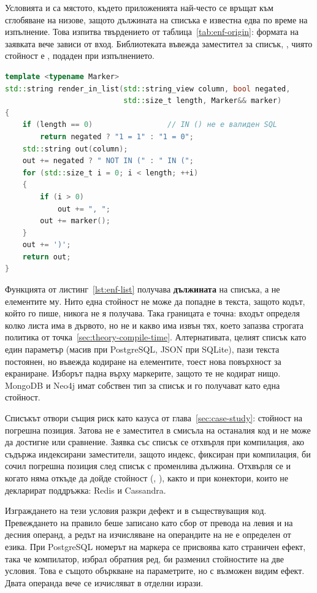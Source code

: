 Условията  и  са мястото, където приложенията най-често се
връщат към сглобяване на низове, защото дължината на списъка е известна едва по
време на изпълнение. Това изпитва твърдението от таблица~\ref{tab:enf-origin}:
формата на заявката вече зависи от вход. Библиотеката въвежда заместител за
списък, , чиято стойност е ,
подаден при изпълнението.

\begin{lstlisting}[language=C++,caption={Единственото, което списъкът променя в текста (съкратено)},label={lst:enf-list}]
template <typename Marker>
std::string render_in_list(std::string_view column, bool negated,
                           std::size_t length, Marker&& marker)
{
    if (length == 0)                 // IN () не е валиден SQL
        return negated ? "1 = 1" : "1 = 0";
    std::string out(column);
    out += negated ? " NOT IN (" : " IN (";
    for (std::size_t i = 0; i < length; ++i)
    {
        if (i > 0)
            out += ", ";
        out += marker();
    }
    out += ')';
    return out;
}
\end{lstlisting}

Функцията от листинг~\ref{lst:enf-list} получава \textbf{дължината} на списъка, а
не елементите му. Нито една стойност не може да попадне в текста, защото кодът,
който го пише, никога не я получава. Така границата е точна: входът определя
колко листа има в дървото, но не и какво има извън тях, което запазва строгата
политика от точка~\ref{sec:theory-compile-time}. Алтернативата, целият списък
като един параметър (масив при PostgreSQL, JSON при SQLite), пази текста постоянен,
но въвежда кодиране на елементите, тоест нова повърхност за екраниране. Изборът
падна върху маркерите, защото те не кодират нищо. MongoDB и Neo4j имат собствен
тип за списък и го получават като една стойност.

Списъкът отвори същия риск като казуса от глава~\ref{sec:case-study}: стойност на
погрешна позиция. Затова  не е заместител в смисъла на
останалия код и не може да достигне  или сравнение. Заявка със списък се
отхвърля при компилация, ако съдържа индексирани заместители, защото индекс,
фиксиран при компилация, би сочил погрешна позиция след списък с променлива
дължина. Отхвърля се и когато няма откъде да дойде стойност (,
), както и при конектори, които не декларират поддръжка: Redis и
Cassandra.

Изграждането на тези условия разкри дефект и в съществуващия код. Превеждането на
правило беше записано като сбор от превода на левия и на десния операнд, а редът
на изчисляване на операндите на \code{+} не е определен от езика. При PostgreSQL
номерът на маркера се присвоява като страничен ефект, така че компилатор, избрал
обратния ред, би разменил стойностите на две условия. Това е същото объркване на
параметрите, но с възможен видим ефект. Двата операнда вече се изчисляват в
отделни изрази.

